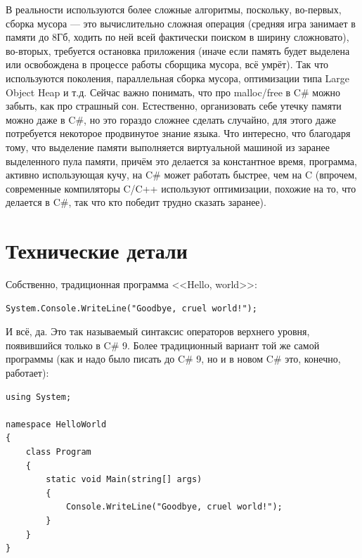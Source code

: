 \documentclass{../../text-style}
\begin{document}
В реальности используются более сложные алгоритмы, поскольку, во-первых, сборка мусора --- это вычислительно сложная операция (средняя игра занимает в памяти до 8Гб, ходить по ней всей фактически поиском в ширину сложновато), во-вторых, требуется остановка приложения (иначе если память будет выделена или освобождена в процессе работы сборщика мусора, всё умрёт). Так что используются поколения, параллельная сборка мусора, оптимизации типа Large Object Heap и т.д. Сейчас важно понимать, что про malloc/free в C\# можно забыть, как про страшный сон. Естественно, организовать себе утечку памяти можно даже в C\#, но это гораздо сложнее сделать случайно, для этого даже потребуется некоторое продвинутое знание языка. Что интересно, что благодаря тому, что выделение памяти выполняется виртуальной машиной из заранее выделенного пула памяти, причём это делается за константное время, программа, активно использующая кучу, на C\# может работать быстрее, чем на C (впрочем, современные компиляторы C/C++ используют оптимизации, похожие на то, что делается в C\#, так что кто победит трудно сказать заранее).

\section{Технические детали}

Собственно, традиционная программа <<Hello, world>>:

\begin{verbatim}
System.Console.WriteLine("Goodbye, cruel world!");
\end{verbatim}

И всё, да. Это так называемый синтаксис операторов верхнего уровня, появившийся только в C\# 9. Более традиционный вариант той же самой программы (как и надо было писать до C\# 9, но и в новом C\# это, конечно, работает):

\begin{verbatim}
using System;

namespace HelloWorld
{
    class Program
    {
        static void Main(string[] args)
        {
            Console.WriteLine("Goodbye, cruel world!");
        }
    }
}
\end{verbatim}
\end{document}
